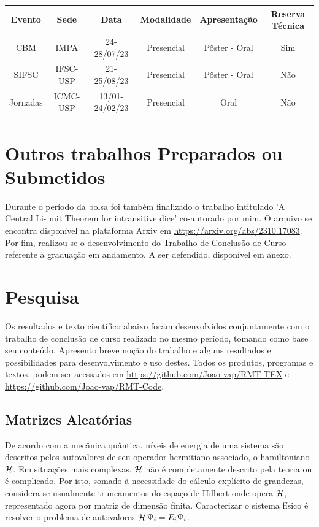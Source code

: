 \documentclass[12pt]{report}
\begin{document}
\hspace{1cm}

\begin{tabular}{|c|c|c|c|c|c|}
	\hline
	Evento &  Sede & Data & Modalidade & Apresentação & Reserva Técnica \\
	\hline
	CBM & IMPA & 24-28/07/23 & Presencial & Pôster - Oral & Sim \\
	\hline
	SIFSC & IFSC-USP & 21-25/08/23 & Presencial & Pôster - Oral & Não \\
	\hline
	Jornadas & ICMC-USP & 13/01-24/02/23 & Presencial & Oral & Não \\
	\hline
\end{tabular}



\section{Outros trabalhos Preparados ou Submetidos}

Durante o período da bolsa foi também finalizado o trabalho intitulado ’A Central Li-
mit Theorem for intransitive dice’ co-autorado por mim. O arquivo se encontra disponível
na plataforma Arxiv em \url{https://arxiv.org/abs/2310.17083}. Por fim, realizou-se o desenvolvimento do Trabalho de Conclusão de Curso referente à graduação em andamento. A ser defendido, disponível em anexo.

\section{Pesquisa}
\label{Pesquisa}

Os resultados e texto científico abaixo foram desenvolvidos conjuntamente com o trabalho de conclusão de curso realizado no mesmo período, tomando como base seu conteúdo. Apresento breve noção do trabalho e alguns resultados e possibilidades para desenvolvimento e uso destes. Todos os produtos, programas e textos, podem ser acessados em \url{https://github.com/Joao-vap/RMT-TEX} e \url{https://github.com/Joao-vap/RMT-Code}.

\subsection{Matrizes Aleatórias}

De acordo com a mecânica quântica, níveis de energia de uma sistema são descritos pelos autovalores de seu operador hermitiano associado, o hamiltoniano $\operatorname{\mathcal{H}}$. Em situações mais complexas, $\operatorname{\mathcal{H}}$ não é completamente descrito pela teoria ou é complicado. Por isto, somado à necessidade do cálculo explícito de grandezas, considera-se usualmente truncamentos do espaço de Hilbert onde opera $\operatorname{\mathcal{H}}$, representado agora por matriz de dimensão finita. Caracterizar o sistema físico é resolver o problema de autovalores $\operatorname{\mathcal{H}} \Psi_i = E_i \Psi_i$.
\end{document}
